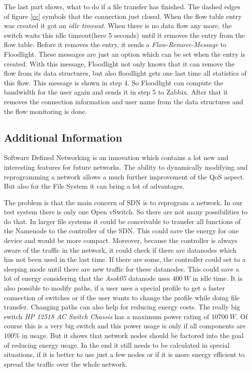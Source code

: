 The last part shows, what to do if a file transfer has finished. The dashed edges of figure \ref{cc} symbols that the connection just closed. When the flow table entry was created it got an \textit{idle timeout}\cite[p. 11]{ofspec}. When there is no data flow any more, the switch waits this idle timeout(here 5 seconds) until it removes the entry from the flow table. Before it removes the entry, it sends a \textit{Flow-Remove-Message}\cite[p. 37]{ofspec} to Floodlight. These messages are just an option which can be set when the entry is created. With this message, Floodlight not only knows that it can remove the flow from its data structures, but also floodlight gets one last time all statistics of this flow. This message is shown in step 4. So Floodlight can compute the bandwidth for the user again and sends it in step 5 to Zabbix. After that it removes the connection information and user name from the data structures and the flow monitoring is done.

\subsection{Additional Information}

Software Defined Networking is an innovation which contains a lot new and interesting features for future networks. The ability to dynamically modifying and reprogramming a network allows a much further improvement of the QoS aspect. But also for the File System it can bring a lot of advantages.

The problem is that the main concern of SDN is to reprogram a network. In our test system there is only one Open vSwitch. So there are not many possibilities to do that. In larger file systems it could be conceivable to transfer all functions of the Namenode to the controller of the SDN. This could save the energy for one device and would be more compact. Moreover, because the controller is always aware of the traffic in the network, it could check if there are datanodes which has not been used in the last time. If there are some, the controller could set to a sleeping mode until there are new traffic for these datanodes. This could save a lot of energy considering that the \textit{Asok05} datanode uses $400\ W$ in idle time. It is also possible to modify paths, if a user uses a special profile to get a faster connection of switches or if the user wants to change the profile while doing file transfer. Changing paths can also help for reducing energy costs. The really big switch \textit{HP 12518 AC Switch Chassis} has a maximum power rating of $10700\ W$\cite{hp}. Of course this is a very big switch and this power usage is only if all components are $100\%$ in usage. But it shows that network nodes should be factored into the goal of reducing energy usage. In the end it still needs to be calculated in special situations, if it is better to use just a few nodes or if it is more energy efficient to spread the traffic over the whole network. 

